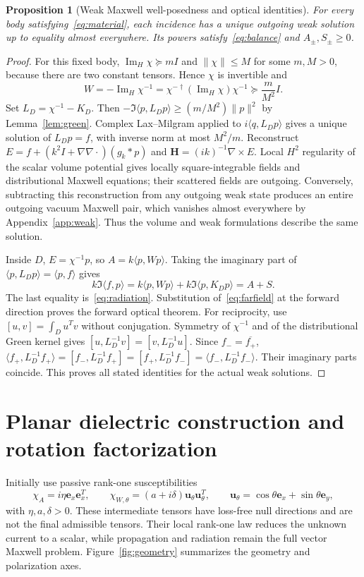 \documentclass[11pt]{article}
\newtheorem{proposition}[theorem]{Proposition}
\newcommand{\ImH}{\operatorname{Im}_{\!H}}
\newcommand{\ey}{\mathbf e_y}
\newcommand{\ex}{\mathbf e_x}
\newcommand{\uvec}{\mathbf u_\theta}
\newcommand{\ip}[2]{\langle #1,#2\rangle}
\newcommand{\norm}[1]{\lVert #1\rVert}
\begin{document}
\begin{proposition}[Weak Maxwell well-posedness and optical identities]\label{prop:physical}
For every body satisfying~\eqref{eq:material}, each incidence has a unique outgoing weak solution up to equality almost everywhere. Its powers satisfy~\eqref{eq:balance} and $A_\pm,S_\pm\geq0$.
\end{proposition}
\begin{proof}
For this fixed body, $\ImH\chi\succeq mI$ and $\norm{\chi}\leq M$ for some $m,M>0$, because there are two constant tensors. Hence $\chi$ is invertible and
\begin{equation}\label{eq:tensor-coercivity}
 W=-\ImH\chi^{-1}=\chi^{-\dagger}(\ImH\chi)\chi^{-1}
 \succeq\frac{m}{M^2}I.
\end{equation}
Set $L_D=\chi^{-1}-K_D$. Then $-\Im\ip{p}{L_Dp}\geq(m/M^2)\norm{p}^2$ by Lemma~\ref{lem:green}. Complex Lax--Milgram applied to $i\ip{q}{L_Dp}$ gives a unique solution of $L_Dp=f$, with inverse norm at most $M^2/m$. Reconstruct $E=f+(k^2I+\nabla\nabla\cdot)(g_k*p)$ and $\mathbf H=(ik)^{-1}\nabla\times E$. Local $H^2$ regularity of the scalar volume potential gives locally square-integrable fields and distributional Maxwell equations; their scattered fields are outgoing. Conversely, subtracting this reconstruction from any outgoing weak state produces an entire outgoing vacuum Maxwell pair, which vanishes almost everywhere by Appendix~\ref{app:weak}. Thus the volume and weak formulations describe the same solution.

Inside $D$, $E=\chi^{-1}p$, so $A=k\ip{p}{Wp}$. Taking the imaginary part of $\ip{p}{L_Dp}=\ip{p}{f}$ gives
\begin{equation}\label{eq:work-balance}
 k\Im\ip{f}{p}=k\ip{p}{Wp}+k\Im\ip{p}{K_Dp}=A+S.
\end{equation}
The last equality is~\eqref{eq:radiation}. Substitution of~\eqref{eq:farfield} at the forward direction proves the forward optical theorem. For reciprocity, use $[u,v]=\int_Du^Tv$ without conjugation. Symmetry of $\chi^{-1}$ and of the distributional Green kernel gives $[u,L_D^{-1}v]=[v,L_D^{-1}u]$. Since $f_-=\overline{f_+}$, $\ip{f_+}{L_D^{-1}f_+}=[f_-,L_D^{-1}f_+]=[f_+,L_D^{-1}f_-]=\ip{f_-}{L_D^{-1}f_-}$. Their imaginary parts coincide. This proves all stated identities for the actual weak solutions.
\end{proof}

\section{Planar dielectric construction and rotation factorization}\label{sec:planar}
Initially use passive rank-one susceptibilities
\begin{equation}\label{eq:rankone}
 \chi_A=i\eta\ex\ex^T,\qquad
 \chi_{W,\theta}=(a+i\delta)\uvec\uvec^T,\qquad
 \uvec=\cos\theta\ex+\sin\theta\ey,
\end{equation}
with $\eta,a,\delta>0$. These intermediate tensors have loss-free null directions and are not the final admissible tensors. Their local rank-one law reduces the unknown current to a scalar, while propagation and radiation remain the full vector Maxwell problem. Figure~\ref{fig:geometry} summarizes the geometry and polarization axes.
\end{document}
